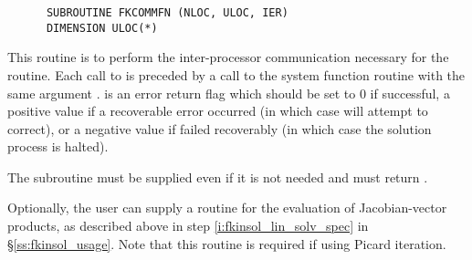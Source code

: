 \begin{Steps}
\begin{verbatim}
      SUBROUTINE FKCOMMFN (NLOC, ULOC, IER)
      DIMENSION ULOC(*)
\end{verbatim}
  This routine is to perform the inter-processor communication necessary
  for the  routine.
  Each call to  is preceded by a call to the system function
  routine  with the same argument .
   is an error return flag which should be set to $0$ if successful,
  a positive value if a recoverable error occurred (in which case {\kinsol} will
  attempt to correct), or a negative value if  failed recoverably
  (in which case the solution process is halted).

  {\warn}The subroutine  must be supplied even if it is not needed
  and must return .

  Optionally, the user can supply a routine  for the evaluation of
  Jacobian-vector products, as described above in step \ref{i:fkinsol_lin_solv_spec}
  in \S\ref{ss:fkinsol_usage}.  Note that this routine is required if using
  Picard iteration.

\end{Steps}
